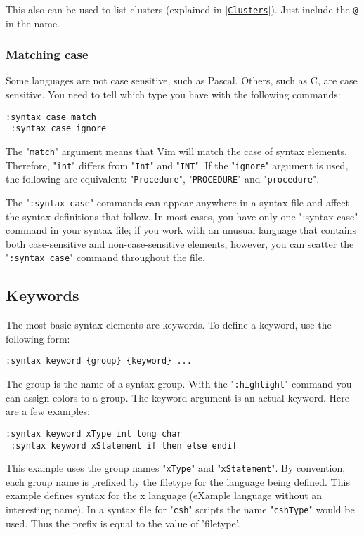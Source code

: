 This also can be used to list clusters (explained in |\hyperref[Clusters]{\texttt{Clusters}}|).
Just include the \verb!@! in the name.

\subsubsection{Matching case}
Some languages are not case sensitive, such as Pascal.
Others, such as C, are case sensitive.
You need to tell which type you have with the following commands:

\begin{Verbatim}[samepage=true]
 :syntax case match
 :syntax case ignore
\end{Verbatim}

The "\verb!match!" argument means that Vim will match the case of syntax elements.
Therefore, "\verb!int!" differs from "\verb!Int!" and "\verb!INT!".
If the "\verb!ignore!" argument is used, the following are equivalent: "\verb!Procedure!", "\verb!PROCEDURE!" and "\verb!procedure!".

The "\verb!:syntax case!" commands can appear anywhere in a syntax file and affect the syntax definitions that follow.
In most cases, you have only one ":syntax case" command in your syntax file; if you work with an unusual language that contains both case-sensitive and non-case-sensitive elements, however, you can scatter the "\verb!:syntax case!" command throughout the file.
\subsection{Keywords}
The most basic syntax elements are keywords.
To define a keyword, use the following form:

\begin{Verbatim}[samepage=true]
 :syntax keyword {group} {keyword} ...
\end{Verbatim}

The {group} is the name of a syntax group.
With the "\verb!:highlight!" command you can assign colors to a {group}.
The {keyword} argument is an actual keyword.
Here are a few examples:

\begin{Verbatim}[samepage=true]
 :syntax keyword xType int long char
 :syntax keyword xStatement if then else endif
\end{Verbatim}

This example uses the group names "\verb!xType!" and "\verb!xStatement!".
By convention, each group name is prefixed by the filetype for the language being defined.
This example defines syntax for the x language (eXample language without an interesting name).
In a syntax file for "\verb!csh!" scripts the name "\verb!cshType!" would be used.
Thus the prefix is equal to the value of 'filetype'.


